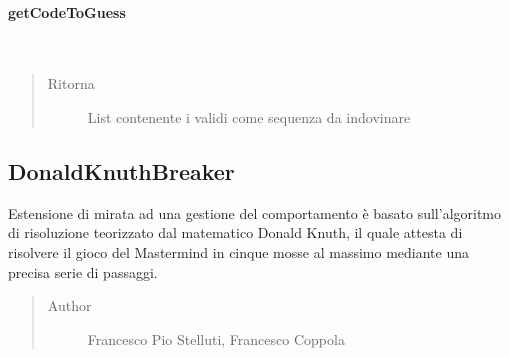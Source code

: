\documentclass[letterpaper,10pt,italian,openany,oneside]{sphinxmanual}
\begin{document}
\paragraph{getCodeToGuess}
\label{\detokenize{source/it/unicam/cs/pa/mastermind/players/CodeMaker:getcodetoguess}}

\begin{fulllineitems}
\label{\detokenize{source/it/unicam/cs/pa/mastermind/players/CodeMaker:it.unicam.cs.pa.mastermind.players.CodeMaker.getCodeToGuess()}}~\begin{quote}\begin{description}
\item[{Ritorna}] \leavevmode
List contenente i  validi come sequenza da indovinare

\end{description}\end{quote}

\end{fulllineitems}



\subsection{DonaldKnuthBreaker}
\label{\detokenize{source/it/unicam/cs/pa/mastermind/players/DonaldKnuthBreaker:donaldknuthbreaker}}\label{\detokenize{source/it/unicam/cs/pa/mastermind/players/DonaldKnuthBreaker::doc}}

\begin{fulllineitems}
\label{\detokenize{source/it/unicam/cs/pa/mastermind/players/DonaldKnuthBreaker:it.unicam.cs.pa.mastermind.players.DonaldKnuthBreaker}}
Estensione di  mirata ad una gestione del comportamento è basato sull’algoritmo di risoluzione teorizzato dal matematico Donald Knuth, il quale attesta di risolvere il gioco del Mastermind in cinque mosse al massimo mediante una precisa serie di passaggi.
\begin{quote}\begin{description}
\item[{Author}] \leavevmode
Francesco Pio Stelluti, Francesco Coppola

\end{description}\end{quote}

\end{fulllineitems}
\end{document}
